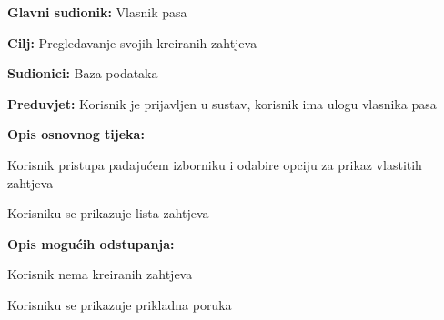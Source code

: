 					\noindent {}
					\begin{packed_item}
						
						\item \textbf{Glavni sudionik: } Vlasnik pasa
						\item  \textbf{Cilj:} Pregledavanje svojih kreiranih zahtjeva
						\item  \textbf{Sudionici:} Baza podataka 
						\item  \textbf{Preduvjet:} Korisnik je prijavljen u sustav, korisnik ima ulogu vlasnika pasa
						\item  \textbf{Opis osnovnog tijeka:}
						
						\item[] \begin{packed_enum}
							
							\item Korisnik pristupa padajućem izborniku i odabire opciju za prikaz vlastitih zahtjeva 
							\item Korisniku se prikazuje lista zahtjeva
							
						\end{packed_enum}
					
						\item  \textbf{Opis mogućih odstupanja:}
						
						\item[] \begin{packed_item}
							
							\item[2.a] Korisnik nema kreiranih zahtjeva
							\item[] \begin{packed_enum}
								
								\item Korisniku se prikazuje prikladna poruka
								
							\end{packed_enum}
						\end{packed_item}
					\end{packed_item}	
				
